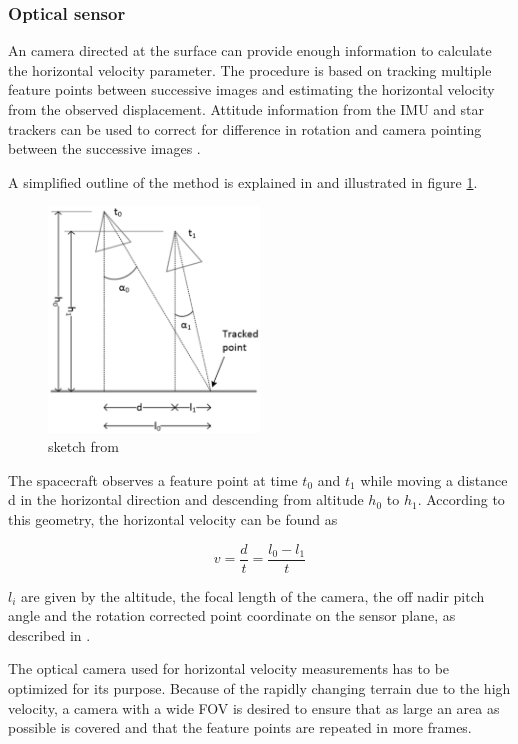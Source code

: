   
\subsubsection{Optical sensor}
An camera directed at the surface can provide enough information to calculate the horizontal velocity parameter. The procedure is based on tracking multiple feature points between successive images and estimating the horizontal velocity from the observed displacement. Attitude information from the IMU and star trackers can be used to correct for difference in rotation and camera pointing between the successive images \cite{alessandro}.

A simplified outline of the method is explained in \cite{alessandro} and illustrated in figure \ref{horvel}.

\begin{figure}
\begin{center}
\includegraphics[width=0.5\textwidth]{figures/horvel.eps}
\caption{sketch from \cite{alessandro}}
\label{horvel}
\end{center}
\end{figure}


The spacecraft observes a feature point at time $t_0$ and $t_1$ while moving a distance d in the horizontal direction and descending from altitude $h_0$ to $h_1$. According to this geometry, the horizontal velocity can be found as

\begin{equation}
v=\dfrac{d}{t}=\dfrac{l_0-l_1}{t}
\end{equation}

$l_i$ are given by the altitude, the focal length of the camera, the off nadir pitch angle and the rotation corrected point coordinate on the sensor plane, as described in \cite{alessandro}.


The optical camera used for horizontal velocity measurements has to be optimized for its purpose. Because of the rapidly changing terrain due to the high velocity, a camera with a wide FOV is desired to ensure that as large an area as possible is covered and that the feature points are repeated in more frames.


